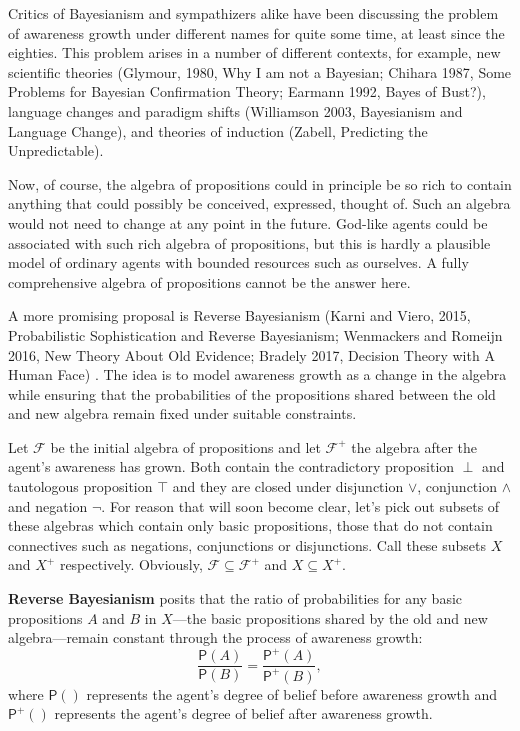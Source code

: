 \documentclass[
  11pt,
  dvipsnames,enabledeprecatedfontcommands]{scrartcl}
\newcommand{\pr}[1]{\ensuremath{\mathsf{P}(#1)}}
\newcommand{\ppr}[2]{\ensuremath{\mathsf{P}^{#1}(#2)}}
\begin{document}
Critics of Bayesianism and sympathizers alike have been discussing the
problem of awareness growth under different names for quite some time,
at least since the eighties. This problem arises in a number of
different contexts, for example, new scientific theories (Glymour, 1980,
Why I am not a Bayesian; Chihara 1987, Some Problems for Bayesian
Confirmation Theory; Earmann 1992, Bayes of Bust?), language changes and
paradigm shifts (Williamson 2003, Bayesianism and Language Change), and
theories of induction (Zabell, Predicting the Unpredictable).

Now, of course, the algebra of propositions could in principle be so
rich to contain anything that could possibly be conceived, expressed,
thought of. Such an algebra would not need to change at any point in the
future. God-like agents could be associated with such rich algebra of
propositions, but this is hardly a plausible model of ordinary agents
with bounded resources such as ourselves. A fully comprehensive algebra
of propositions cannot be the answer here.

A more promising proposal is Reverse Bayesianism (Karni and Viero, 2015,
Probabilistic Sophistication and Reverse Bayesianism; Wenmackers and
Romeijn 2016, New Theory About Old Evidence; Bradely 2017, Decision
Theory with A Human Face) . The idea is to model awareness growth as a
change in the algebra while ensuring that the probabilities of the
propositions shared between the old and new algebra remain fixed under
suitable constraints.

Let \(\mathcal{F}\) be the initial algebra of propositions and let
\(\mathcal{F}^+\) the algebra after the agent's awareness has grown.
Both contain the contradictory proposition \(\perp\) and tautologous
proposition \(\top\) and they are closed under disjunction \(\vee\),
conjunction \(\wedge\) and negation \(\neg\). For reason that will soon
become clear, let's pick out subsets of these algebras which contain
only basic propositions, those that do not contain connectives such as
negations, conjunctions or disjunctions. Call these subsets \(X\) and
\(X^+\) respectively. Obviously, \(\mathcal{F}\subseteq \mathcal{F}^+\)
and \(X\subseteq X^+\).

\textbf{Reverse Bayesianism} posits that the ratio of probabilities for
any basic propositions \(A\) and \(B\) in \(X\)---the basic propositions
shared by the old and new algebra---remain constant through the process
of awareness growth:
\[\frac{\pr{A}}{\pr{B}} = \frac{\ppr{+}{A}}{\ppr{+}{B}},\] where
\(\pr{}\) represents the agent's degree of belief before awareness
growth and \(\ppr{+}{}\) represents the agent's degree of belief after
awareness growth.
\end{document}
